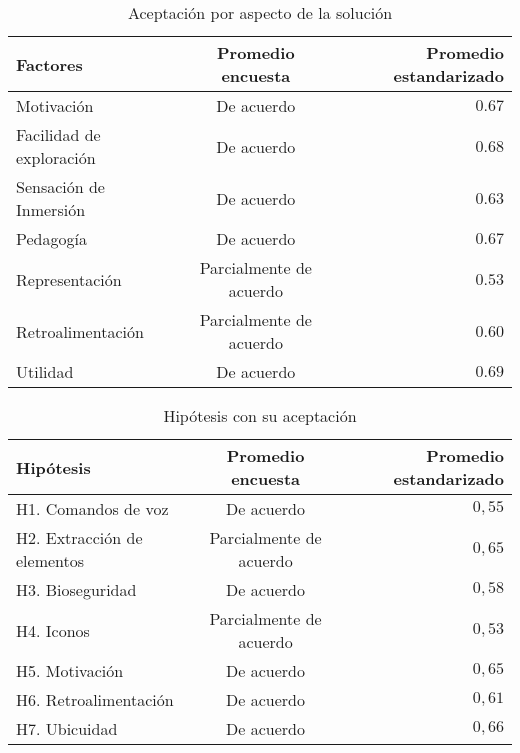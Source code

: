 \begin{table}
\centering
\caption{Aceptación por aspecto de la solución}
\begin{tabular}{lcr}
\toprule
Factores        & Promedio encuesta      & Promedio estandarizado \\
\midrule
Motivación               & De acuerdo              & $0.67$  \\
Facilidad de exploración & De acuerdo              & $0.68$  \\
Sensación de Inmersión   & De acuerdo              & $0.63$  \\
Pedagogía                & De acuerdo              & $0.67$  \\
Representación           & Parcialmente de acuerdo & $0.53$  \\
Retroalimentación        & Parcialmente de acuerdo & $0.60$  \\
Utilidad                 & De acuerdo              & $0.69$  \\
\bottomrule
\end{tabular}
\label{tab:resultado_resumen_aspectos_aceptacion}
\end{table}



\begin{table}
\centering
\caption{Hipótesis con su aceptación}
\begin{tabular}{lcr}
\toprule
Hipótesis                   & Promedio encuesta     & Promedio estandarizado \\
\midrule
H1. Comandos de voz         & De acuerdo              & $0,55$ \\
H2. Extracción de elementos & Parcialmente de acuerdo & $0,65$ \\
H3. Bioseguridad            & De acuerdo              & $0,58$ \\
H4. Iconos                  & Parcialmente de acuerdo & $0,53$ \\
H5. Motivación              & De acuerdo              & $0,65$ \\
H6. Retroalimentación       & De acuerdo              & $0,61$ \\
H7. Ubicuidad               & De acuerdo              & $0,66$ \\
\bottomrule
\end{tabular}
\label{tab:resultado_resumen_hipotesis}
\end{table}



